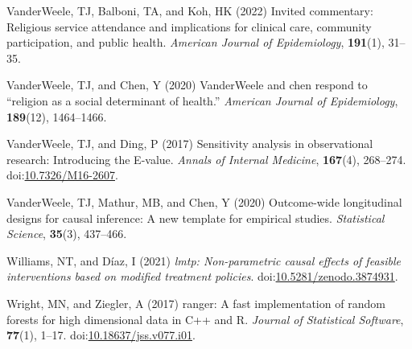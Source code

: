 \documentclass[
  single column]{article}
\newlength{\cslhangindent}
\newenvironment{CSLReferences}[2] %
 {\begin{list}{}{%
  \setlength{\itemindent}{0pt}
  \setlength{\leftmargin}{0pt}
  \setlength{\parsep}{0pt}
  \ifodd #1
   \setlength{\leftmargin}{\cslhangindent}
   \setlength{\itemindent}{-1\cslhangindent}
  \fi
  \setlength{\itemsep}{#2\baselineskip}}}
 {\end{list}}
\begin{document}
\begin{CSLReferences}{1}{0}
VanderWeele, TJ, Balboni, TA, and Koh, HK (2022) Invited commentary:
Religious service attendance and implications for clinical care,
community participation, and public health. \emph{American Journal of
Epidemiology}, \textbf{191}(1), 31--35.

VanderWeele, TJ, and Chen, Y (2020) VanderWeele and chen respond to
{``religion as a social determinant of health.''} \emph{American Journal
of Epidemiology}, \textbf{189}(12), 1464--1466.

VanderWeele, TJ, and Ding, P (2017) Sensitivity analysis in
observational research: Introducing the {E}-value. \emph{Annals of
Internal Medicine}, \textbf{167}(4), 268--274.
doi:\href{https://doi.org/10.7326/M16-2607}{10.7326/M16-2607}.

VanderWeele, TJ, Mathur, MB, and Chen, Y (2020) Outcome-wide
longitudinal designs for causal inference: A new template for empirical
studies. \emph{Statistical Science}, \textbf{35}(3), 437--466.

Williams, NT, and Díaz, I (2021) \emph{{l}mtp: Non-parametric causal
effects of feasible interventions based on modified treatment policies}.
doi:\href{https://doi.org/10.5281/zenodo.3874931}{10.5281/zenodo.3874931}.

Wright, MN, and Ziegler, A (2017) {ranger}: A fast implementation of
random forests for high dimensional data in {C++} and {R}. \emph{Journal
of Statistical Software}, \textbf{77}(1), 1--17.
doi:\href{https://doi.org/10.18637/jss.v077.i01}{10.18637/jss.v077.i01}.

\end{CSLReferences}
\end{document}
